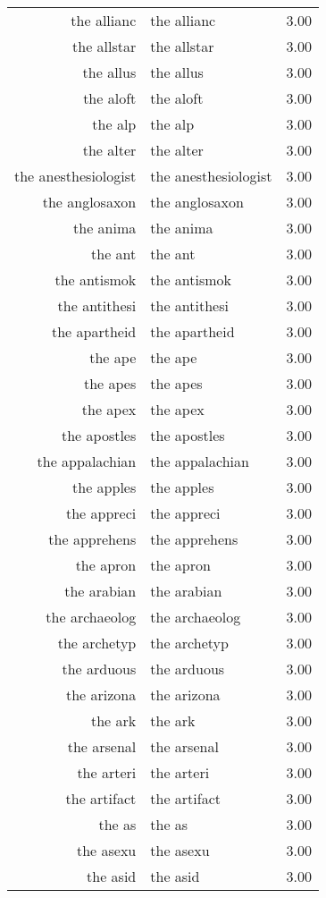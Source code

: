 \begin{table}[ht]
\begin{tabular}{rlr}
  the allianc & the allianc & 3.00 \\ 
  the allstar & the allstar & 3.00 \\ 
  the allus & the allus & 3.00 \\ 
  the aloft & the aloft & 3.00 \\ 
  the alp & the alp & 3.00 \\ 
  the alter & the alter & 3.00 \\ 
  the anesthesiologist & the anesthesiologist & 3.00 \\ 
  the anglosaxon & the anglosaxon & 3.00 \\ 
  the anima & the anima & 3.00 \\ 
  the ant & the ant & 3.00 \\ 
  the antismok & the antismok & 3.00 \\ 
  the antithesi & the antithesi & 3.00 \\ 
  the apartheid & the apartheid & 3.00 \\ 
  the ape & the ape & 3.00 \\ 
  the apes & the apes & 3.00 \\ 
  the apex & the apex & 3.00 \\ 
  the apostles & the apostles & 3.00 \\ 
  the appalachian & the appalachian & 3.00 \\ 
  the apples & the apples & 3.00 \\ 
  the appreci & the appreci & 3.00 \\ 
  the apprehens & the apprehens & 3.00 \\ 
  the apron & the apron & 3.00 \\ 
  the arabian & the arabian & 3.00 \\ 
  the archaeolog & the archaeolog & 3.00 \\ 
  the archetyp & the archetyp & 3.00 \\ 
  the arduous & the arduous & 3.00 \\ 
  the arizona & the arizona & 3.00 \\ 
  the ark & the ark & 3.00 \\ 
  the arsenal & the arsenal & 3.00 \\ 
  the arteri & the arteri & 3.00 \\ 
  the artifact & the artifact & 3.00 \\ 
  the as & the as & 3.00 \\ 
  the asexu & the asexu & 3.00 \\ 
  the asid & the asid & 3.00 \\ 

\end{tabular}
\end{table}
